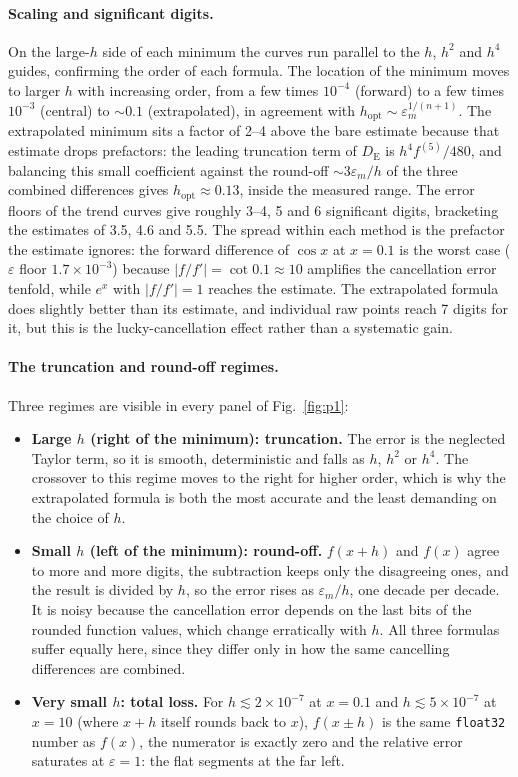 \documentclass[11pt]{article}
\newcommand{\eps}{\varepsilon}
\newcommand{\epsm}{\varepsilon_m}
\newcommand{\code}[1]{\texttt{#1}}
\begin{document}
\paragraph{Scaling and significant digits.}
On the large-$h$ side of each minimum the curves run parallel to the $h$,
$h^{2}$ and $h^{4}$ guides, confirming the order of each formula. The location
of the minimum moves to larger $h$ with increasing order, from a few times
$10^{-4}$ (forward) to a few times $10^{-3}$ (central) to $\sim0.1$
(extrapolated), in agreement with $h_{\mathrm{opt}}\sim\epsm^{1/(n+1)}$. The
extrapolated minimum sits a factor of 2--4 above the bare estimate because that
estimate drops prefactors: the leading truncation term of $D_{\mathrm{E}}$ is
$h^{4}f^{(5)}/480$, and balancing this small coefficient against the round-off
$\sim3\epsm/h$ of the three combined differences gives
$h_{\mathrm{opt}}\approx0.13$, inside the measured range. The error floors of
the trend curves give
roughly 3--4, 5 and 6 significant digits, bracketing the estimates of 3.5, 4.6
and 5.5. The spread within each method is the prefactor the estimate ignores:
the forward difference of $\cos x$ at $x=0.1$ is the worst case ($\eps$ floor
$1.7\times10^{-3}$) because $|f/f'| = \cot 0.1\approx10$ amplifies the
cancellation error tenfold, while $e^{x}$ with $|f/f'|=1$ reaches the estimate.
The extrapolated formula does slightly better than its estimate, and individual
raw points reach 7 digits for it, but this is the lucky-cancellation effect
rather than a systematic gain.

\paragraph{The truncation and round-off regimes.}
Three regimes are visible in every panel of Fig.~\ref{fig:p1}:
\begin{itemize}
\item \textbf{Large $h$ (right of the minimum): truncation.} The error is the
neglected Taylor term, so it is smooth, deterministic and falls as $h$, $h^{2}$
or $h^{4}$. The crossover to this regime moves to the right for higher order,
which is why the extrapolated formula is both the most accurate and the least
demanding on the choice of $h$.
\item \textbf{Small $h$ (left of the minimum): round-off.} $f(x+h)$ and $f(x)$
agree to more and more digits, the subtraction keeps only the disagreeing ones,
and the result is divided by $h$, so the error rises as $\epsm/h$, one decade
per decade. It is noisy because the cancellation error depends on the last bits
of the rounded function values, which change erratically with $h$. All three
formulas suffer equally here, since they differ only in how the same
cancelling differences are combined.
\item \textbf{Very small $h$: total loss.} For $h\lesssim2\times10^{-7}$ at
$x=0.1$ and $h\lesssim5\times10^{-7}$ at $x=10$ (where $x+h$ itself rounds back
to $x$), $f(x\pm h)$ is the same \code{float32} number as $f(x)$, the numerator
is exactly zero and the relative error saturates at $\eps=1$: the flat segments
at the far left.
\end{itemize}
\end{document}

